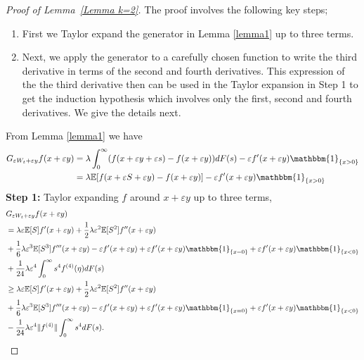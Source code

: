 \documentclass[11pt,letterpaper,reqno]{article}
\theoremstyle{thmstyleone}%
\theoremstyle{thmstyletwo}%
\theoremstyle{thmstylethree}%
\numberwithin{equation}{section}
\begin{document}
\begin{proof}[Proof of Lemma~\ref{Lemma k=2}]
 The proof involves the following key steps;
\begin{enumerate}
    \item First we Taylor expand the generator in Lemma \ref{lemma1} up to three terms.
    \item Next, we apply the generator to a carefully chosen function to write the third derivative in terms of the second and fourth derivatives. 
    This expression of the the third derivative then can be used in the Taylor expansion in Step 1  to get the induction hypothesis which involves only the first, second and fourth derivatives. We give the details next.
\end{enumerate}
From Lemma \ref{lemma1} we have 
\begin{align*}
     G_{\varepsilon W_t+\varepsilon y}f(x+\varepsilon y)
     &= \lambda \int_0^\infty (f(x+\varepsilon y +\varepsilon s)-f(x+\varepsilon y))dF(s)-\varepsilon f'(x+\varepsilon y)\mathbbm{1}_{\{x>0\}}\\
     &= \lambda \mathbb E[f(x+\varepsilon S+\varepsilon y)-f(x+\varepsilon y)]-\varepsilon f'(x+\varepsilon y)\mathbbm{1}_{\{x>0\}}
\end{align*}
\textbf{Step 1:} Taylor expanding $f$ around $x+\varepsilon y$ up to three terms,
\begin{align} \label{eqcomb1}
       &G_{\varepsilon W_t+\varepsilon y}f(x+\varepsilon y) \nonumber \\ 
       &=\lambda \varepsilon \mathbb E[S]f'(x+\varepsilon y)+\frac{1}{2}\lambda \varepsilon^2 \mathbb E[S^2]f''(x+\varepsilon y)\nonumber \\
     &+\frac{1}{6}\lambda \varepsilon^3 \mathbb E[S^3]f'''(x+\varepsilon y)-\varepsilon f'(x+\varepsilon y)+\varepsilon f'(x+\varepsilon y)\mathbbm{1}_{\{x=0\}}+\varepsilon f'(x+\varepsilon y)\mathbbm{1}_{\{x<0\}}\nonumber \\
     &+\frac{1}{24}\lambda \varepsilon^4 \int_0^\infty s^4 f^{(4)}(\eta)dF(s)\nonumber \\
     &\geq \lambda \varepsilon \mathbb E[S]f'(x+\varepsilon y)+\frac{1}{2}\lambda \varepsilon^2 \mathbb E[S^2]f''(x+\varepsilon y)\nonumber \\
     &+\frac{1}{6}\lambda \varepsilon^3 \mathbb E[S^3]f'''(x+\varepsilon y)-\varepsilon f'(x+\varepsilon y)+\varepsilon f'(x+\varepsilon y)\mathbbm{1}_{\{x=0\}}+\varepsilon f'(x+\varepsilon y)\mathbbm{1}_{\{x<0\}}\nonumber \\
     &-\frac{1}{24}\lambda \varepsilon^4  \|f^{(4)}\|\int_0^\infty s^4 dF(s).

\end{align}
\end{proof}
\end{document}
